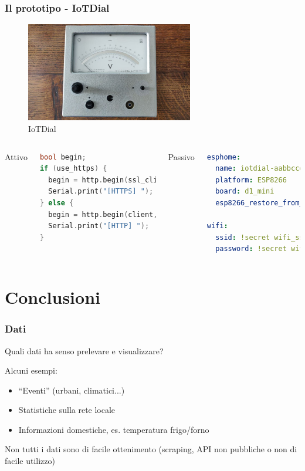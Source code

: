 \documentclass[aspectratio=169]{beamer}
\begin{document}
\begin{frame}
\frametitle{Il prototipo - IoTDial}
\begin{figure}[h]
  \centering
  \includegraphics[width=0.65\textwidth]{iotdial}
  \caption{IoTDial}
\end{figure}

\framebreak

\begin{columns}
Attivo
\begin{lstlisting}[language=cpp]
bool begin;
if (use_https) {
  begin = http.begin(ssl_client, apiUrl);
  Serial.print("[HTTPS] ");
} else {
  begin = http.begin(client, apiUrl);
  Serial.print("[HTTP] ");
}
\end{lstlisting}

Passivo
\begin{lstlisting}[language=yaml]
esphome:
  name: iotdial-aabbccdd
  platform: ESP8266
  board: d1_mini
  esp8266_restore_from_flash: yes

wifi:
  ssid: !secret wifi_ssid
  password: !secret wifi_password
\end{lstlisting}
\end{columns}
\end{frame}


\section{Conclusioni}
\begin{frame}
\frametitle{Dati}
Quali dati ha senso prelevare e visualizzare?
\vspace{1cm}

Alcuni esempi:
\begin{itemize}
  \item ``Eventi'' (urbani, climatici...)
  \item Statistiche sulla rete locale
  \item Informazioni domestiche, es. temperatura frigo/forno
\end{itemize}

Non tutti i dati sono di facile ottenimento (scraping, API non pubbliche o non di facile utilizzo)
\end{frame} %
\end{document}
